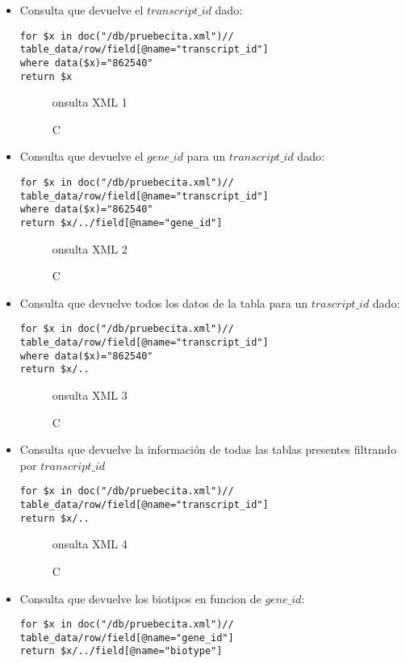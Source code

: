 \documentclass[12pt,a4paper]{article}
\begin{document}
\begin{itemize}

\item Consulta que devuelve el $transcript\_id$ dado:

\begin{verbatim}
for $x in doc("/db/pruebecita.xml")//
table_data/row/field[@name="transcript_id"]
where data($x)="862540"
return $x
\end{verbatim}

\begin{figure}[!h]
\centering
{}
\caption Consulta XML 1
\label{xml1}
\end{figure}

\item Consulta que devuelve el $gene\_id$ para un $transcript\_id$ dado:

\begin{verbatim}
for $x in doc("/db/pruebecita.xml")//
table_data/row/field[@name="transcript_id"]
where data($x)="862540"
return $x/../field[@name="gene_id"]
\end{verbatim}

\begin{figure}[!h]
\centering
{}
\caption Consulta XML 2
\label{xml2}
\end{figure}

\item Consulta que devuelve todos los datos de la tabla para un $trascript\_id$ dado:

\begin{verbatim}
for $x in doc("/db/pruebecita.xml")//
table_data/row/field[@name="transcript_id"]
where data($x)="862540"
return $x/..
\end{verbatim}

\begin{figure}[!h]
\centering
{}
\caption Consulta XML 3
\label{xml3}
\end{figure}


\item Consulta que devuelve la información de todas las tablas presentes filtrando por
$transcript\_id$

\begin{verbatim}
for $x in doc("/db/pruebecita.xml")//
table_data/row/field[@name="transcript_id"]
return $x/..
\end{verbatim}

\begin{figure}[!h]
\centering
{}
\caption Consulta XML 4
\label{xml4}
\end{figure}


\item Consulta que devuelve los biotipos en funcion de $gene\_id:$
\begin{verbatim}
for $x in doc("/db/pruebecita.xml")//
table_data/row/field[@name="gene_id"]
return $x/../field[@name="biotype"]
\end{verbatim}
\end{itemize}
\end{document}
